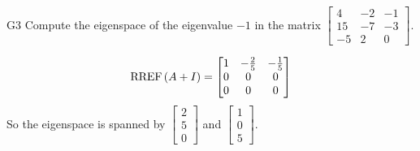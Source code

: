 \documentclass{sbgLAquiz}
\begin{document}
\begin{extract}\newpage\end{extract}
\begin{problem}{G3}
Compute the eigenspace of the eigenvalue $-1$ in the matrix $\begin{bmatrix} 4 & -2 & -1 \\ 15 & -7 & -3 \\ -5 & 2 & 0 \end{bmatrix}$. 
\end{problem}
\begin{solution}
$$\operatorname{RREF}\left(A+I\right) = \begin{bmatrix} 1 & - \frac{2}{5} & -\frac{1}{5} \\ 0 & 0 & 0 \\ 0 & 0 & 0 \end{bmatrix}$$
So the eigenspace is spanned by $\begin{bmatrix} 2 \\5 \\  0 \end{bmatrix}$ and $\begin{bmatrix} 1 \\ 0 \\ 5 \end{bmatrix}$.
\end{solution}
\end{document}
